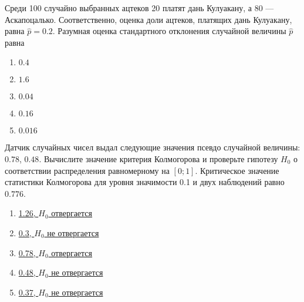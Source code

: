 \documentclass[t]{beamer}
\begin{document}
 \begin{frame} \label{59} 
\begin{block}{59} 

Среди 100 случайно выбранных ацтеков 20 платят дань Кулуакану, а 80 — Аскапоцалько. Соответственно, оценка доли ацтеков, платящих дань Кулуакану, равна $\hat{p}=0.2$. Разумная оценка стандартного отклонения случайной величины $\hat{p}$ равна
 


 \end{block} 
\begin{enumerate} 
\item[] \hyperlink{59-No}{\beamergotobutton{} $0.4$}
\item[] \hyperlink{59-No}{\beamergotobutton{} $1.6$}
\item[] \hyperlink{59-Yes}{\beamergotobutton{} $0.04$}
\item[] \hyperlink{59-No}{\beamergotobutton{} $0.16$}
\item[] \hyperlink{59-No}{\beamergotobutton{} $0.016$}
\end{enumerate} 
\end{frame} 


 \begin{frame} \label{60} 
\begin{block}{60} 

Датчик случайных чисел выдал следующие значения псевдо случайной величины: $0.78$, $0.48$. Вычислите значение критерия Колмогорова и проверьте гипотезу $H_0$ о соответствии распределения равномерному на $[0;1]$. Критическое значение статистики Колмогорова для уровня значимости 0.1 и двух наблюдений равно $0.776$.
 


 \end{block} 
\begin{enumerate} 
\item[] \hyperlink{60-No}{\beamergotobutton{} 1.26, $H_0$ отвергается}
\item[] \hyperlink{60-No}{\beamergotobutton{} 0.3, $H_0$ не отвергается}
\item[] \hyperlink{60-Yes}{\beamergotobutton{} 0.78, $H_0$ отвергается}
\item[] \hyperlink{60-No}{\beamergotobutton{} 0.48, $H_0$ не отвергается}
\item[] \hyperlink{60-No}{\beamergotobutton{} 0.37, $H_0$ не отвергается}
\end{enumerate} 
\end{frame} 
\end{document}
